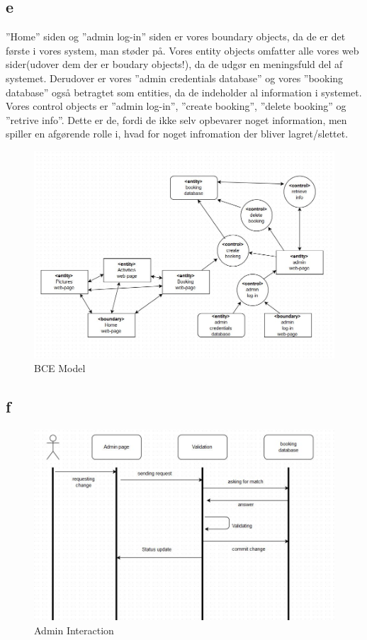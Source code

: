 \documentclass[12pt,a4paper]{article}
\begin{document}
\subsection{e}
”Home” siden og ”admin log-in” siden er vores  boundary objects, da de er det første i vores system, man støder på.
Vores entity objects omfatter alle vores web sider(udover dem der er boudary objects!), da de udgør en meningsfuld del af systemet. Derudover er vores ”admin credentials database” og vores ”booking database” også betragtet som entities, da de indeholder al information i systemet.
Vores control objects er ”admin log-in”, ”create booking”, ”delete booking” og ”retrive info”. Dette er de, fordi de ikke selv opbevarer noget information, men spiller en afgørende rolle i, hvad for noget infromation der bliver lagret/slettet. \\
\begin{figure}[H]
\includegraphics[scale=0.6]{BCE.jpg}
\caption{BCE Model}
\end{figure}

\subsection{f}

\begin{figure}[H]
\includegraphics[scale=0.4]{adminInteraction.jpg}
\caption{Admin Interaction}
\end{figure}
\end{document}
